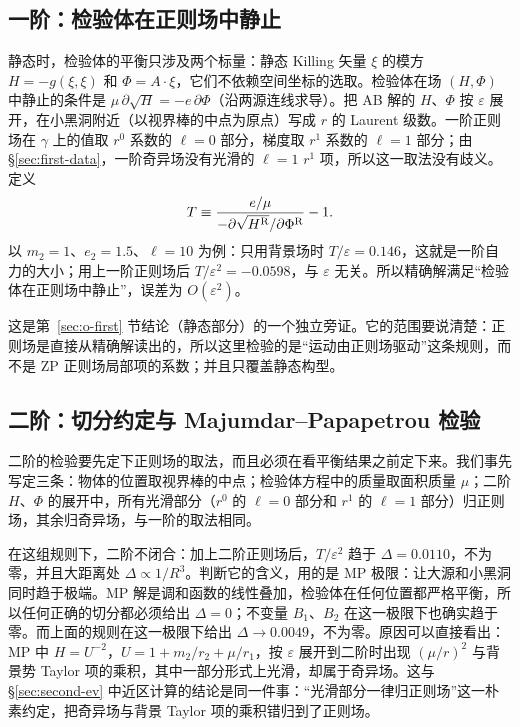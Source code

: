 \documentclass[11pt,a4paper]{ctexart}
\begin{document}
\subsection{一阶：检验体在正则场中静止}\label{sec:exact-first}

静态时，检验体的平衡只涉及两个标量：静态 Killing 矢量 $\xi$ 的模方 $H=-g(\xi,\xi)$ 和 $\Phi=A\cdot\xi$，它们不依赖空间坐标的选取。检验体在场 $(H,\Phi)$ 中静止的条件是 $\mu\,\partial\sqrt H=-e\,\partial\Phi$（沿两源连线求导）。把 AB 解的 $H$、$\Phi$ 按 $\varepsilon$ 展开，在小黑洞附近（以视界棒的中点为原点）写成 $r$ 的 Laurent 级数。一阶正则场在 $\gamma$ 上的值取 $r^0$ 系数的 $\ell=0$ 部分，梯度取 $r^1$ 系数的 $\ell=1$ 部分；由 \S\ref{sec:first-data}，一阶奇异场没有光滑的 $\ell=1$ $r^1$ 项，所以这一取法没有歧义。定义
\begin{equation*}
T\equiv\frac{e/\mu}{-\partial\sqrt{H^{\rm R}}/\partial\Phi^{\rm R}}-1 .
\end{equation*}
以 $m_2=1$、$e_2=1.5$、$\ell=10$ 为例：只用背景场时 $T/\varepsilon=0.146$，这就是一阶自力的大小；用上一阶正则场后 $T/\varepsilon^2=-0.0598$，与 $\varepsilon$ 无关。所以精确解满足“检验体在正则场中静止”，误差为 $O(\varepsilon^2)$。

这是第~\ref{sec:o-first} 节结论（静态部分）的一个独立旁证。它的范围要说清楚：正则场是直接从精确解读出的，所以这里检验的是“运动由正则场驱动”这条规则，而不是 ZP 正则场局部项的系数；并且只覆盖静态构型。

\subsection{二阶：切分约定与 Majumdar--Papapetrou 检验}\label{sec:exact-second}

二阶的检验要先定下正则场的取法，而且必须在看平衡结果之前定下来。我们事先写定三条：物体的位置取视界棒的中点；检验体方程中的质量取面积质量 $\mu$；二阶 $H$、$\Phi$ 的展开中，所有光滑部分（$r^0$ 的 $\ell=0$ 部分和 $r^1$ 的 $\ell=1$ 部分）归正则场，其余归奇异场，与一阶的取法相同。

在这组规则下，二阶不闭合：加上二阶正则场后，$T/\varepsilon^2$ 趋于 $\Delta=0.0110$，不为零，并且大距离处 $\Delta\propto1/R^3$。判断它的含义，用的是 MP 极限：让大源和小黑洞同时趋于极端。MP 解是调和函数的线性叠加，检验体在任何位置都严格平衡，所以任何正确的切分都必须给出 $\Delta=0$；不变量 $B_1$、$B_2$ 在这一极限下也确实趋于零。而上面的规则在这一极限下给出 $\Delta\to0.0049$，不为零。原因可以直接看出：MP 中 $H=U^{-2}$，$U=1+m_2/r_2+\mu/r_1$，按 $\varepsilon$ 展开到二阶时出现 $(\mu/r)^2$ 与背景势 Taylor 项的乘积，其中一部分形式上光滑，却属于奇异场。这与 \S\ref{sec:second-ev} 中近区计算的结论是同一件事：“光滑部分一律归正则场”这一朴素约定，把奇异场与背景 Taylor 项的乘积错归到了正则场。
\end{document}
